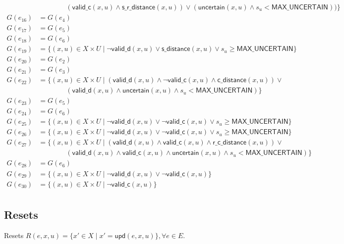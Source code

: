 \documentclass[12pt]{article}
\theoremstyle{definition}
\begin{document}
\[\begin{aligned}
&\qquad\qquad(\mathsf{valid\_c}(x,u) \land \mathsf{s\_r\_distance}(x,u)) \lor (\mathsf{uncertain}(x,u) \land s_u < \mathsf{MAX\_UNCERTAIN})\big) \}\\
G(e_{16}) &= G(e_4) \\
G(e_{17}) &= G(e_5) \\
G(e_{18}) &= G(e_6) \\
G(e_{19}) &= \{(x,u) \in X \times U \mid \neg \mathsf{valid\_d}(x,u) \lor \mathsf{s\_distance}(x,u) \lor s_u \ge \mathsf{MAX\_UNCERTAIN} \}\\
G(e_{20}) &= G(e_2)\\
G(e_{21}) &= G(e_3) \\
G(e_{22}) &= \{(x,u) \in X \times U \mid (\mathsf{valid\_d}(x,u) \land \neg \mathsf{valid\_c}(x,u) \land \mathsf{c\_distance}(x,u)) \lor \\
&\qquad\qquad(\mathsf{valid\_d}(x,u) \land \mathsf{uncertain}(x,u) \land s_u < \mathsf{MAX\_UNCERTAIN})\} \\
G(e_{23}) &= G(e_5) \\
G(e_{24}) &= G(e_6) \\
G(e_{25}) &= \{(x,u) \in X \times U \mid \neg \mathsf{valid\_d}(x,u) \lor \neg \mathsf{valid\_c}(x,u) \lor s_u \ge \mathsf{MAX\_UNCERTAIN} \}\\
G(e_{26}) &= \{(x,u) \in X \times U \mid \neg \mathsf{valid\_d}(x,u) \lor \neg \mathsf{valid\_c}(x,u) \lor s_u \ge \mathsf{MAX\_UNCERTAIN} \}\\
G(e_{27}) &= \{(x,u) \in X \times U \mid (\mathsf{valid\_d}(x,u) \land \mathsf{valid\_c}(x,u) \land \mathsf{r\_c\_distance}(x,u)) \lor \\ 
&\qquad\qquad (\mathsf{valid\_d}(x,u) \land \mathsf{valid\_c}(x,u) \land \mathsf{uncertain}(x,u) \land s_u < \mathsf{MAX\_UNCERTAIN})\}\\
G(e_{28}) &= G(e_6) \\
G(e_{29}) &= \{ (x,u) \in X \times U \mid \neg \mathsf{valid\_d}(x,u) \lor \neg \mathsf{valid\_c}(x,u) \} \\
G(e_{30}) &= \{ (x,u) \in X \times U \mid \neg \mathsf{valid\_c}(x,u) \} \\
\end{aligned}
\]

\subsection{Resets}

Resets $ R(e,x,u) = \{x' \in X \mid x' = \mathsf{upd}(e,x,u) \}, \forall e \in E$.
\end{document}
